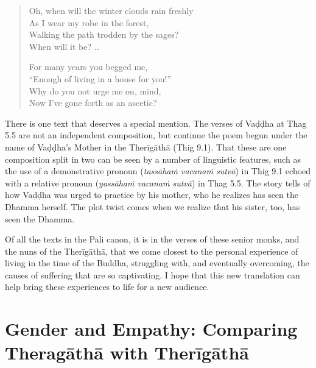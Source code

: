 \documentclass[12pt,openany]{book}%
\begin{document}
\begin{quotation}%
Oh, when will the winter clouds rain freshly\\

As I wear my robe in the forest,\\

Walking the path trodden by the sages?\\

When will it be? …

For many years you begged me,\\

“Enough of living in a house for you!”\\

Why do you not urge me on, mind,\\

Now I’ve gone forth as an ascetic?

%
\end{quotation}

There is one text that deserves a special mention. The verses of \textsanskrit{Vaḍḍha} at Thag 5.5 are not an independent composition, but continue the poem begun under the name of \textsanskrit{Vaḍḍha}’s Mother in the \textsanskrit{Therīgāthā} (Thig 9.1). That these are one composition split in two can be seen by a number of linguistic features, such as the use of a demonstrative pronoun (\textit{\textsanskrit{tassāhaṁ} \textsanskrit{vacanaṁ} \textsanskrit{sutvā}}) in Thig 9.1 echoed with a relative pronoun (\textit{\textsanskrit{yassāhaṁ} \textsanskrit{vacanaṁ} \textsanskrit{sutvā}}) in Thag 5.5. The story tells of how \textsanskrit{Vaḍḍha} was urged to practice by his mother, who he realizes has seen the Dhamma herself. The plot twist comes when we realize that his sister, too, has seen the Dhamma.

Of all the texts in the Pali canon, it is in the verses of these senior monks, and the nuns of the \textsanskrit{Therīgāthā}, that we come closest to the personal experience of living in the time of the Buddha, struggling with, and eventually overcoming, the causes of suffering that are so captivating. I hope that this new translation can help bring these experiences to life for a new audience.

\section*{Gender and Empathy: Comparing \textsanskrit{Theragāthā} with \textsanskrit{Therīgāthā}}
\end{document}
